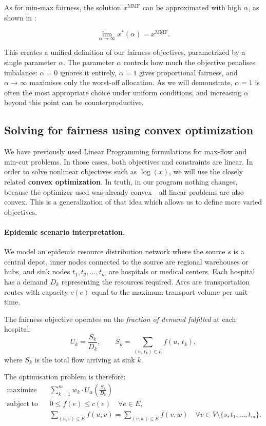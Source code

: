 \documentclass[12pt, openany]{article}
\begin{document}
As for min-max fairness, the solution \(x^{\mathrm{MMF}}\) can be approximated with high $\alpha$, as shown in \cite{mo2000fair}:

\[
\lim_{\alpha \to \infty}
x^*(\alpha)
=
x^{\mathrm{MMF}}.
\]

This creates a unified definition of our fairness objectives, parametrized by a single parameter $\alpha$. The parameter $\alpha$ controls how much the objective penalises imbalance: $\alpha = 0$ ignores it entirely, $\alpha = 1$ gives proportional fairness, and $\alpha \to \infty$ maximises only the worst-off allocation. As we will demonstrate, $\alpha = 1$ is often the most appropriate choice under uniform conditions, and increasing $\alpha$ beyond this point can be counterproductive.

\subsection{Solving for fairness using convex optimization}

We have previously used Linear Programming formulations for max-flow and min-cut problems. In those cases, both objectives and constraints are linear. In order to solve nonlinear objectives such as $\log(x)$, we will use the closely related \textbf{convex optimization}. In truth, in our program nothing changes, because the optimizer used was already convex - all linear problems are also convex. This is a generalization of that idea which allows us to define more varied objectives.

\paragraph{Epidemic scenario interpretation.} We model an epidemic resource distribution network where the source $s$ is a central depot, inner nodes connected to the source are regional warehouses or hubs, and sink nodes $t_1, t_2, \dots, t_m$ are hospitals or medical centers. Each hospital has a demand $D_k$ representing the resources required. Arcs are transportation routes with capacity $c(e)$ equal to the maximum transport volume per unit time.

The fairness objective operates on the \textit{fraction of demand fulfilled} at each hospital:
\[
U_k = \frac{S_k}{D_k}, \qquad
S_k = \sum_{(u,\, t_k) \in E} f(u,\, t_k),
\]
where $S_k$ is the total flow arriving at sink $k$.

The optimisation problem is therefore:
\[
\begin{aligned}
\text{maximize} \quad & \sum_{k=1}^{m} w_k \cdot U_\alpha\!\left(\frac{S_k}{D_k}\right) \\[4pt]
\text{subject to} \quad
& 0 \le f(e) \le c(e) \quad \forall e \in E, \\
& \sum_{(u,v)\in E} f(u,v) = \sum_{(v,w)\in E} f(v,w)
\quad \forall v \in V \setminus \{s, t_1, \dots, t_m\}.
\end{aligned}
\]
\end{document}
